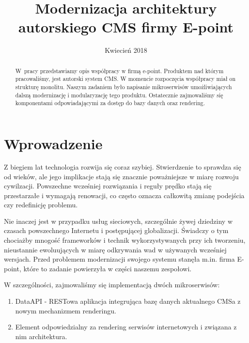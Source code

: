 \documentclass[licencjacka]{pracamgr}
\title{Modernizacja architektury autorskiego CMS firmy E-point}
\date{Kwiecień 2018}
\begin{document}
\maketitle

\begin{abstract}
  W~pracy przedstawiamy opis współpracy w firmą e-point.
  Produktem nad którym pracowaliśmy, jest autorski
  system CMS. W momencie rozpoczęcia współpracy miał on strukturę monolitu.
  Naszym zadaniem było napisanie mikroserwisów umożliwiających
  dalszą modernizację i modularyzację tego produktu. 
  Ostatecznie zajmowaliśmy się komponentami odpowiadającymi za dostęp do bazy danych oraz rendering.
\end{abstract}

\tableofcontents

\chapter*{Wprowadzenie}
    
Z biegiem lat technologia rozwija się coraz szybiej. Stwierdzenie to sprawdza się od wieków, ale jego implikacje stają się znacznie poważniejsze w miarę rozwoju cywilzacji. Powszechne wcześniej rozwiązania i reguły prędko stają się przestarzałe i wymagają renowacji, co często oznacza całkowitą zmianę podejścia czy redefinicję problemu.

\vspace{1mm}

Nie inaczej jest w przypadku usług sieciowych, szczególnie żywej dziedziny w czasach powszechnego Internetu i postępującej globalizacji. Świadczy o tym chociażby mnogość frameworków i technik wykorzystywanych przy ich tworzeniu, nieustannie ewoluujących w miarę odkrywania wad w używanych wcześniej wersjach. Przed problemem modernizacji swojego systemu stanęła m.in. firma E-point, które to zadanie powierzyła w części naszemu zespołowi.

\vspace{1mm}

W szczególności, zajmowaliśmy się implementacją dwóch mikroserwisów:
\begin{enumerate}
\item DataAPI - RESTowa aplikacja integrująca bazę danych aktualnego CMSa z nowym mechanizmem renderingu.
\item Element odpowiedzialny za rendering serwisów internetowych i związana z nim architektura.
\end{enumerate}
\end{document}
